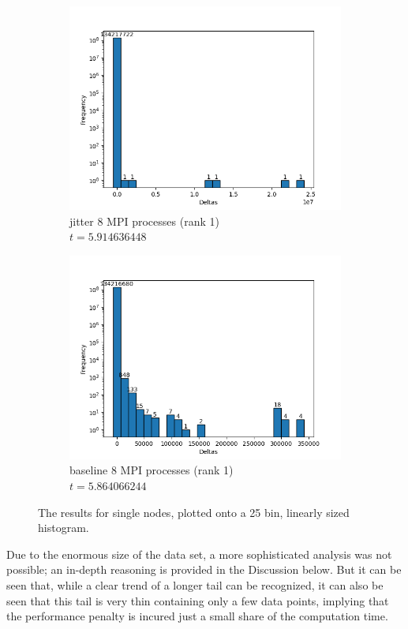 \begin{figure}[H]
\begin{subfigure}{.42\textwidth}
  \centering
  \includegraphics[width=\textwidth]{./plots_jitter/jitter/output_size_8_rank_1_25.png}
  \caption{jitter 8 MPI processes (rank 1)\\$t=5.914636448$}
\end{subfigure}%
\begin{subfigure}{.42\textwidth}
  \centering
  \includegraphics[width=\textwidth]{./plots_jitter/jitter_baseline/output_size_8_rank_1_25.png}
  \caption{baseline 8 MPI processes (rank 1)\\$t=5.864066244$}
\end{subfigure}
\caption{The results for single nodes, plotted onto a 25 bin, linearly sized histogram.}
\end{figure}
Due to the enormous size of the data set, a more sophisticated analysis was not possible; an in-depth reasoning is provided in the Discussion below. But it can be seen that, while a clear trend of a longer tail can be recognized, it can also be seen that this tail is very thin containing only a few data points, implying that the performance penalty is incured just a small share of the computation time.

